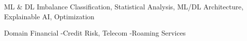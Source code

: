 \vspace{-2mm}
\begin{cvskills}
	\cvskill
    {ML \&  DL} %
    {Imbalance Classification, Statistical Analysis, ML/DL Architecture, Explainable AI, Optimization} %

	\cvskill
    {Domain} %
    {Financial -Credit Risk, Telecom -Roaming Services} %
\end{cvskills}